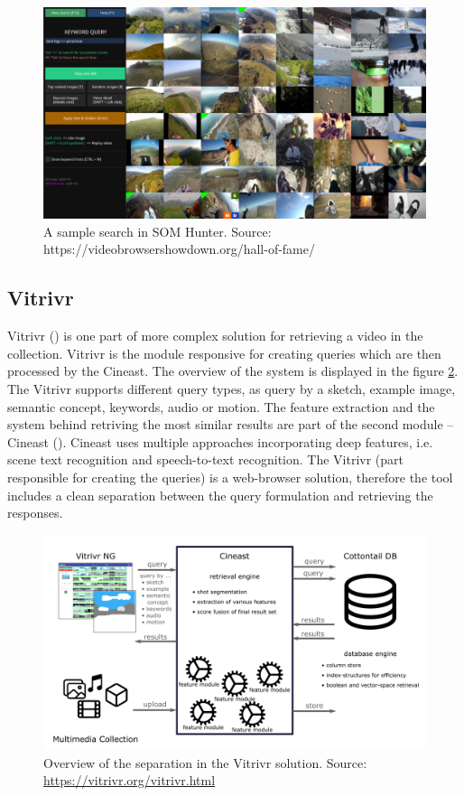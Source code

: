 \begin{figure}
    \centering
    \includegraphics[width=0.99\linewidth]{img/som_hunter_small.png}
    \caption{A sample search in SOM Hunter. Source: https://videobrowsershowdown.org/hall-of-fame/}
    \label{fig:som_hunter}
\end{figure}

\subsection{Vitrivr}

Vitrivr (\cite{rossetto2016vitrivr}) is one part of more complex solution for retrieving a video in the collection. Vitrivr is the module responsive for creating queries which are then processed by the Cineast. The overview of the system is displayed in the figure \ref{fig:vitrivr}. The Vitrivr supports different query types, as query by a sketch, example image, semantic concept, keywords, audio or motion. The feature extraction and the system behind retriving the most similar results are part of the second module -- Cineast (\cite{rossetto2016searching}). Cineast uses multiple approaches incorporating deep features, i.e. scene text recognition and speech-to-text recognition. The Vitrivr (part responsible for creating the queries) is a web-browser solution, therefore the tool includes a clean separation between the query formulation and retrieving the responses.

\begin{figure}
    \centering
    \includegraphics[width=\linewidth]{img/vitrivr.png}
    \caption{Overview of the separation in the Vitrivr solution. Source: \url{https://vitrivr.org/vitrivr.html}}
    \label{fig:vitrivr}
\end{figure}

